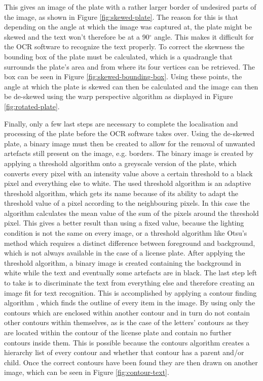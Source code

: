 This gives an image of the plate with a rather larger border of undesired parts of the image, as shown in Figure \ref{fig:skewed-plate}. The reason for this is that depending on the angle at which the image was captured at, the plate might be skewed and the text won't therefore be at a 90$^{\circ}$ angle. This makes it difficult for the OCR software to recognize the text properly. To correct the skewness the bounding box of the plate must be calculated, which is a quadrangle that surrounds the plate's area and from where its four vertices can be retrieved. The box can be seen in Figure \ref{fig:skewed-bounding-box}. Using these points, the angle at which the plate is skewed can then be calculated and the image can then be de-skewed using the warp perspective algorithm \cite{warpperspective} as displayed in Figure \ref{fig:rotated-plate}. 

Finally, only a few last steps are necessary to complete the localisation and processing of the plate before the OCR software takes over. Using the de-skewed plate, a binary image must then be created to allow for the removal of unwanted artefacts still present on the image, e.g. borders. The binary image is created by applying a threshold algorithm onto a greyscale version of the plate, which converts every pixel with an intensity value above a certain threshold to a black pixel and everything else to white. The used threshold algorithm is an adaptive threshold algorithm, which gets its name because of its ability to adapt the threshold value of a pixel according to the neighbouring pixels. In this case the algorithm calculates the mean value of the sum of the pixels around the threshold pixel. This gives a better result than using a fixed value, because the lighting condition is not the same on every image, or a threshold algorithm like Otsu's method \cite{otsu} which requires a distinct difference between foreground and background, which is not always available in the case of a license plate. After applying the threshold algorithm, a binary image is created containing the background in white while the text and eventually some artefacts are in black. The last step left to take is to discriminate the text from everything else and therefore creating an image fit for text recognition. This is accomplished by applying a contour finding algorithm \cite{suzuki}, which finds the outline of every item in the image. By using only the contours which are enclosed within another contour and in turn do not contain other contours within themselves, as is the case of the letters' contours as they are located within the contour of the license plate and contain no further contours inside them. This is possible because the contours algorithm creates a hierarchy list of every contour and whether that contour has a parent and/or child. Once the correct contours have been found they are then drawn on another image, which can be seen in Figure \ref{fig:contour-text}.

